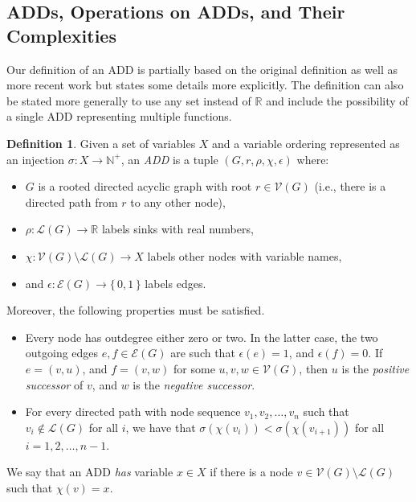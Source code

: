 \documentclass{article}
\theoremstyle{definition}
\newtheorem{definition}{Definition}
\theoremstyle{remark}
\begin{document}
\subsection{ADDs, Operations on ADDs, and Their Complexities} \label{sec:adds}

Our definition of an ADD is partially based on the original definition
\cite{DBLP:journals/fmsd/BaharFGHMPS97} as well as more recent work
\cite{DBLP:conf/cp/DudekPV20} but states some details more explicitly. The
definition can also be stated more generally to use any set instead of
$\mathbb{R}$ and include the possibility of a single ADD representing multiple
functions.

\begin{definition}
  Given a set of variables $X$ and a variable ordering represented as an injection
  $\sigma\colon X \to \mathbb{N}^+$, an \emph{ADD} is a tuple $(G, r, \rho,
  \chi, \epsilon)$ where:
  \begin{itemize}
  \item $G$ is a rooted directed acyclic graph with root $r \in \mathcal{V}(G)$
    (i.e., there is a directed path from $r$ to any other node),
  \item $\rho\colon \mathcal{L}(G) \to \mathbb{R}$ labels sinks with real
    numbers,
  \item $\chi\colon \mathcal{V}(G) \setminus \mathcal{L}(G) \to X$ labels other
    nodes with variable names,
  \item and $\epsilon\colon \mathcal{E}(G) \to \{\,0, 1\,\}$ labels edges.
  \end{itemize}
  Moreover, the following properties must be satisfied.
  \begin{itemize}
  \item Every node has outdegree either zero or two. In the latter case, the two
    outgoing edges $e, f \in \mathcal{E}(G)$ are such that $\epsilon(e) = 1$,
    and $\epsilon(f) = 0$. If $e = (v, u)$, and $f = (v, w)$ for some $u, v, w
    \in \mathcal{V}(G)$, then $u$ is the \emph{positive successor} of $v$, and
    $w$ is the \emph{negative successor}.
  \item For every directed path with node sequence $v_1, v_2, \dots, v_n$ such
    that $v_i \not\in \mathcal{L}(G)$ for all $i$, we have that
    $\sigma(\chi(v_i)) < \sigma(\chi(v_{i+1}))$ for all $i = 1, 2, \dots, n -
    1$.
  \end{itemize}
  We say that an ADD \emph{has} variable $x \in X$ if there is a node $v \in
  \mathcal{V}(G) \setminus \mathcal{L}(G)$ such that $\chi(v) = x$.


\end{definition}
\end{document}
